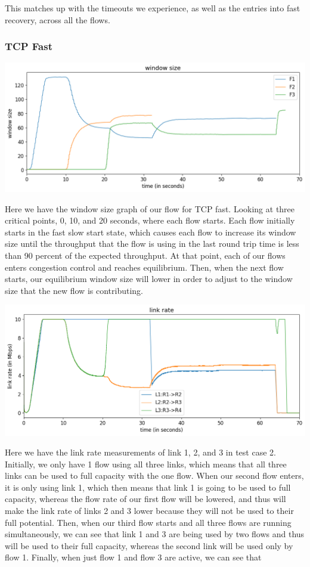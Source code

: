 \documentclass{article}
\begin{document}
This matches up with the timeouts we experience, as well as the entries into fast recovery, across all the flows.




\subsubsection{TCP Fast}

\includegraphics[width = \textwidth]{"test_case2_fast window size"}

Here we have the window size graph of our flow for TCP fast. Looking at three critical points, 0, 10, and 20 seconds, where each flow starts. Each flow initially starts in the fast slow start state, which causes each flow to increase its window size until the throughput that the flow is using in the last round trip time is less than 90 percent of the expected throughput. At that point, each of our flows enters congestion control and reaches equilibrium. Then, when the next flow starts, our equilibrium window size will lower in order to adjust to the window size that the new flow is contributing.

\includegraphics[width = \textwidth]{"test_case2_fast link rate"}

Here we have the link rate measurements of link 1, 2, and 3 in test case 2. Initially, we only have 1 flow using all three links, which means that all three links can be used to full capacity with the one flow. When our second flow enters, it is only using link 1, which then means that link 1 is going to be used to full capacity, whereas the flow rate of our first flow will be lowered, and thus will make the link rate of links 2 and 3 lower because they will not be used to their full potential. Then, when our third flow starts and all three flows are running simultaneously, we can see that link 1 and 3 are being used by two flows and thus will be used to their full capacity, whereas the second link will be used only by flow 1. Finally, when just flow 1 and flow 3 are active, we can see that 
\end{document}
